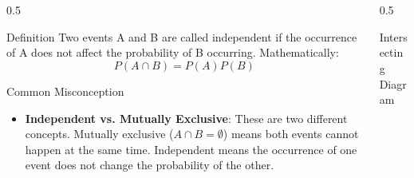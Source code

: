 \begin{frame}[t]
\end{frame}

\begin{frame}
    \frametitle{\ }
    \footnotesize
    \vspace{-8mm}
    \begin{columns}[T]
        \begin{column}{0.5\textwidth}
            \begin{block}{Definition}
                Two events A and B are called independent if the occurrence of A does not affect the probability of B occurring. Mathematically:
                \[ P(A \cap B) = P(A)P(B) \]
            \end{block}
            \vspace{-4mm}
            \begin{block}{Common Misconception}
                \begin{itemize}
                    \item \textbf{Independent vs. Mutually Exclusive}: These are two different concepts. Mutually exclusive (\(A \cap B = \emptyset\)) means both events cannot happen at the same time. Independent means the occurrence of one event does not change the probability of the other.
                \end{itemize}
            \end{block}
        \end{column}
        
        \begin{column}{0.5\textwidth}
            \begin{block}{Intersecting Diagram}
                \centering
\end{block}
\end{column}
\end{columns}
\end{frame}
